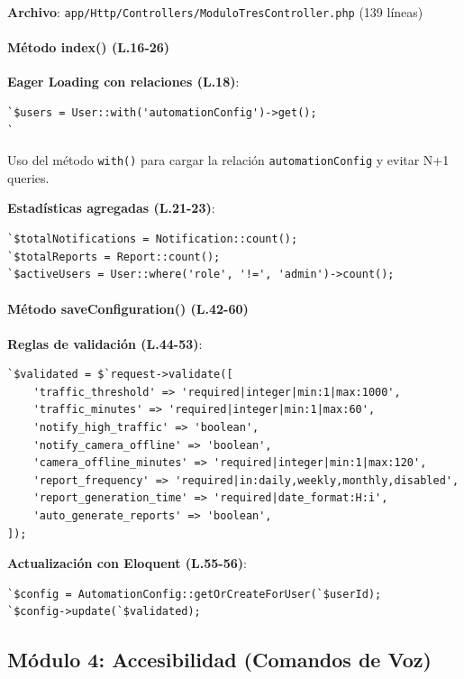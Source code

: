 \textbf{Archivo}: \texttt{app/Http/Controllers/ModuloTresController.php} (139 líneas)

\paragraph{Método index() (L.16-26)}

\textbf{Eager Loading con relaciones (L.18)}:
\begin{lstlisting}[style=phpstyle]
`$users = User::with('automationConfig')->get();
`\end{lstlisting}

Uso del método \texttt{with()} para cargar la relación \texttt{automationConfig} y evitar N+1 queries.

\textbf{Estadísticas agregadas (L.21-23)}:
\begin{lstlisting}[style=phpstyle]
`$totalNotifications = Notification::count();
`$totalReports = Report::count();
`$activeUsers = User::where('role', '!=', 'admin')->count();
\end{lstlisting}

\paragraph{Método saveConfiguration() (L.42-60)}

\textbf{Reglas de validación (L.44-53)}:
\begin{lstlisting}[style=phpstyle]
`$validated = $`request->validate([
    'traffic_threshold' => 'required|integer|min:1|max:1000',
    'traffic_minutes' => 'required|integer|min:1|max:60',
    'notify_high_traffic' => 'boolean',
    'notify_camera_offline' => 'boolean',
    'camera_offline_minutes' => 'required|integer|min:1|max:120',
    'report_frequency' => 'required|in:daily,weekly,monthly,disabled',
    'report_generation_time' => 'required|date_format:H:i',
    'auto_generate_reports' => 'boolean',
]);
\end{lstlisting}

\textbf{Actualización con Eloquent (L.55-56)}:
\begin{lstlisting}[style=phpstyle]
`$config = AutomationConfig::getOrCreateForUser(`$userId);
`$config->update(`$validated);
\end{lstlisting}

\subsection{Módulo 4: Accesibilidad (Comandos de Voz)}

